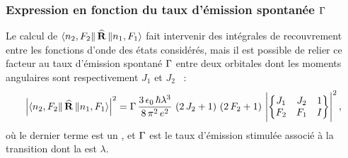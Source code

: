 \subsubsection{Expression en fonction du taux d'émission spontanée ${\Gamma}$}
Le calcul de $\BraAbsKet{n_2,F_2}{\OperR}{n_1,F_1}$ fait intervenir des intégrales de recouvrement entre les fonctions d'onde des états considérés, mais il est possible de relier ce facteur au taux d'émission spontané ${\Gamma}$ entre deux orbitales dont les moments angulaires sont respectivement $J_1$ et $J_2$~\cite{Lou00} :
\begin{equation}
	\Module{\BraAbsKet{n_2,F_2}{\OperR}{n_1,F_1}}^2 = \pulsSpont
	\,\frac{3\,\epsilon_0\,\hbar\lambda^3}{8\,\pi^2\,e^2}
	\,\left( 2\,J_2+1 \right) \, \left( 2\,F_2+1 \right)
	\,\Module{\begin{Bmatrix}%
	J_1 & J_2 & 1 \\%
	F_2 & F_1 & I%
	\end{Bmatrix}}^2
\virguleformule
	\label{eq:GammaMatriceReduit}
\end{equation}
où le dernier terme est un , et ${\Gamma}$ est le taux d'émission stimulée associé à la transition dont la \lo est $\lambda$.

\casse

